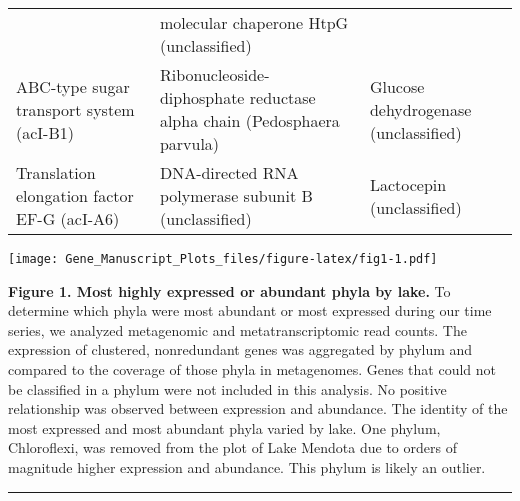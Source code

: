 \documentclass[]{article}
\begin{document}
\begin{longtable}[]{@{}lll@{}}
\begin{minipage}[t]{0.33\columnwidth}
\end{minipage} & \begin{minipage}[t]{0.33\columnwidth}\raggedright\strut
molecular chaperone HtpG (unclassified)\strut
\end{minipage}\tabularnewline
\begin{minipage}[t]{0.24\columnwidth}\raggedright\strut
ABC-type sugar transport system (acI-B1)\strut
\end{minipage} & \begin{minipage}[t]{0.33\columnwidth}\raggedright\strut
Ribonucleoside-diphosphate reductase alpha chain (Pedosphaera
parvula)\strut
\end{minipage} & \begin{minipage}[t]{0.33\columnwidth}\raggedright\strut
Glucose dehydrogenase (unclassified)\strut
\end{minipage}\tabularnewline
\begin{minipage}[t]{0.24\columnwidth}\raggedright\strut
Translation elongation factor EF-G (acI-A6)\strut
\end{minipage} & \begin{minipage}[t]{0.33\columnwidth}\raggedright\strut
DNA-directed RNA polymerase subunit B (unclassified)\strut
\end{minipage} & \begin{minipage}[t]{0.33\columnwidth}\raggedright\strut
Lactocepin (unclassified)\strut
\end{minipage}\tabularnewline
\bottomrule
\end{longtable}

\texttt{[image: Gene\_Manuscript\_Plots\_files/figure-latex/fig1-1.pdf]}

\textbf{Figure 1. Most highly expressed or abundant phyla by lake.} To
determine which phyla were most abundant or most expressed during our
time series, we analyzed metagenomic and metatranscriptomic read counts.
The expression of clustered, nonredundant genes was aggregated by phylum
and compared to the coverage of those phyla in metagenomes. Genes that
could not be classified in a phylum were not included in this analysis.
No positive relationship was observed between expression and abundance.
The identity of the most expressed and most abundant phyla varied by
lake. One phylum, Chloroflexi, was removed from the plot of Lake Mendota
due to orders of magnitude higher expression and abundance. This phylum
is likely an outlier.

\begin{center}\rule{0.5\linewidth}{\linethickness}\end{center}
\end{document}
